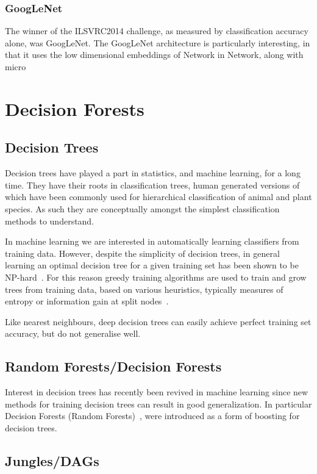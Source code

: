 \documentclass[thesis]{subfiles}
\begin{document}
\subsubsection{GoogLeNet}
The winner of the ILSVRC2014 challenge, as measured by classification accuracy alone, was GoogLeNet. The GoogLeNet architecture is particularly interesting, in that it uses the low dimensional embeddings of Network in Network, along with micro

\section{Decision Forests}
\subsection{Decision Trees}
Decision trees have played a part in statistics, and machine learning, for a long time. They have their roots in classification trees, human generated versions of which have been commonly used for hierarchical classification of animal and plant species. As such they are conceptually amongst the simplest classification methods to understand. 

In machine learning we are interested in automatically learning classifiers from training data. However, despite the simplicity of decision trees, in general learning an optimal decision tree for a given training set has been shown to be NP-hard~\cite{journals/iandc/HancockJLT96}. For this reason greedy training algorithms are used to train and grow trees from training data, based on various heuristics, typically measures of entropy or information gain at split nodes~\cite{breiman84}. 

Like nearest neighbours, deep decision trees can easily achieve perfect training set accuracy, but do not generalise well. 

\subsection{Random Forests/Decision Forests}
Interest in decision trees has recently been revived in machine learning since new methods for training decision trees can result in good generalization. In particular Decision Forests (Random Forests)~\cite{journals/neco/AmitG97,breiman2001random}, were introduced as a form of boosting for decision trees.
\subsection{Jungles/DAGs}
\end{document}
